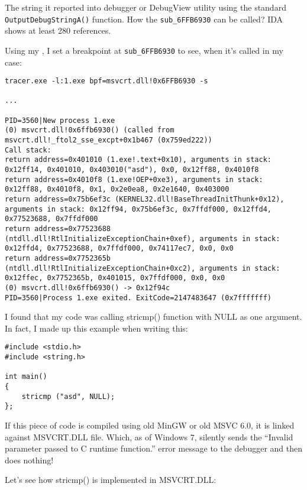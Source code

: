 The string it reported into debugger or DebugView utility using the standard \verb|OutputDebugStringA()| function.
How the \verb|sub_6FFB6930| can be called?
IDA shows at least 280 references.

Using my \tracer, I set a breakpoint at \verb|sub_6FFB6930| to see, when it's called in my case:

\begin{lstlisting}
tracer.exe -l:1.exe bpf=msvcrt.dll!0x6FFB6930 -s

...

PID=3560|New process 1.exe
(0) msvcrt.dll!0x6ffb6930() (called from msvcrt.dll!_ftol2_sse_excpt+0x1b467 (0x759ed222))
Call stack:
return address=0x401010 (1.exe!.text+0x10), arguments in stack: 0x12ff14, 0x401010, 0x403010("asd"), 0x0, 0x12ff88, 0x4010f8
return address=0x4010f8 (1.exe!OEP+0xe3), arguments in stack: 0x12ff88, 0x4010f8, 0x1, 0x2e0ea8, 0x2e1640, 0x403000
return address=0x75b6ef3c (KERNEL32.dll!BaseThreadInitThunk+0x12), arguments in stack: 0x12ff94, 0x75b6ef3c, 0x7ffdf000, 0x12ffd4, 0x77523688, 0x7ffdf000
return address=0x77523688 (ntdll.dll!RtlInitializeExceptionChain+0xef), arguments in stack: 0x12ffd4, 0x77523688, 0x7ffdf000, 0x74117ec7, 0x0, 0x0
return address=0x7752365b (ntdll.dll!RtlInitializeExceptionChain+0xc2), arguments in stack: 0x12ffec, 0x7752365b, 0x401015, 0x7ffdf000, 0x0, 0x0
(0) msvcrt.dll!0x6ffb6930() -> 0x12f94c
PID=3560|Process 1.exe exited. ExitCode=2147483647 (0x7fffffff)
\end{lstlisting}

I found that my code was calling stricmp() function with NULL as one argument.
In fact, I made up this example when writing this:

\begin{lstlisting}[style=customc]
#include <stdio.h>
#include <string.h>

int main()
{
	stricmp ("asd", NULL);
};
\end{lstlisting}

If this piece of code is compiled using old MinGW or old MSVC 6.0, it is linked against MSVCRT.DLL file.
Which, as of Windows 7, silently sends the ``Invalid parameter passed to C runtime function.''
error message to the debugger and then does nothing!

Let's see how stricmp() is implemented in MSVCRT.DLL:

